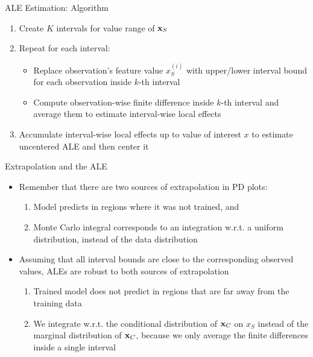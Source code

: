 \documentclass[11pt,compress,t,notes=noshow, aspectratio=169, xcolor=table]{beamer}
\begin{document}
\begin{frame}{ALE Estimation: Algorithm}

\begin{enumerate}
	\item Create $K$ intervals for value range of $\xv_S$
	\item Repeat for each interval: %
	  \begin{itemize}
	  \item Replace observation's feature value $x_S^{(i)}$ with upper/lower interval bound for each observation inside $k$-th interval
	  \item Compute observation-wise finite difference inside $k$-th interval and average them to estimate interval-wise local effects
	  \end{itemize}
  \item Accumulate interval-wise local effects up to value of interest $x$ to estimate uncentered ALE and then center it
\end{enumerate}

\end{frame}

\begin{frame}{Extrapolation and the ALE}
\begin{itemize}
\item Remember that there are two sources of extrapolation in PD plots:
  \begin{enumerate}
  \item Model predicts in regions where it was not trained, and
  \item Monte Carlo integral corresponds to an integration w.r.t. a uniform distribution, instead of the data distribution
  \end{enumerate}
\item Assuming that all interval bounds are close to the corresponding observed values, ALEs are robust to both sources of extrapolation
  \begin{enumerate}
    \item Trained model does not predict in regions that are far away from the training data
    \item We integrate w.r.t. the conditional distribution of $\xv_C$ on $x_S$ instead of the marginal distribution of $\xv_C$, because we only average the finite differences inside a single interval
  \end{enumerate}
\end{itemize}
\end{frame}
\end{document}
